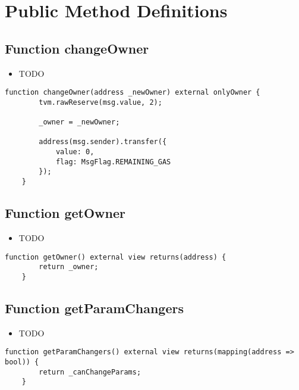\section{Public Method Definitions}


\subsection{Function changeOwner}

\noindent\begin{itemize}
\item TODO
\end{itemize}

\begin{lstlisting}[firstnumber=39]
    function changeOwner(address _newOwner) external onlyOwner {
        tvm.rawReserve(msg.value, 2);

        _owner = _newOwner;

        address(msg.sender).transfer({
            value: 0,
            flag: MsgFlag.REMAINING_GAS
        });
    }
\end{lstlisting}

\subsection{Function getOwner}

\noindent\begin{itemize}
\item TODO
\end{itemize}

\begin{lstlisting}[firstnumber=50]
    function getOwner() external view returns(address) {
        return _owner;
    }
\end{lstlisting}

\subsection{Function getParamChangers}

\noindent\begin{itemize}
\item TODO
\end{itemize}

\begin{lstlisting}[firstnumber=58]
    function getParamChangers() external view returns(mapping(address => bool)) {
        return _canChangeParams;
    }
\end{lstlisting}

